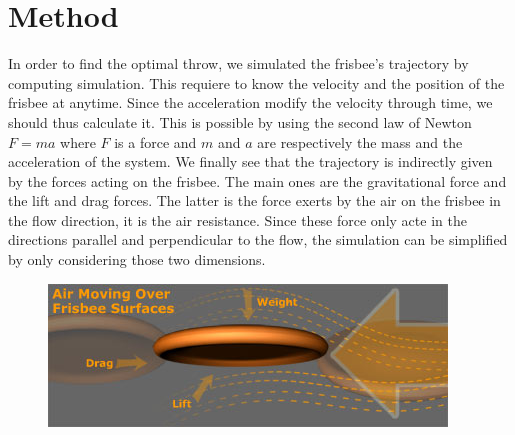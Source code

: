 \documentclass[10pt,a4paper]{report}
\begin{document}
\section{Method}
In order to find the optimal throw, we simulated the frisbee's trajectory by computing simulation. This requiere to know the velocity and the position of the frisbee at anytime. Since the acceleration modify the velocity through time, we should thus calculate it. This is possible by using the second law of Newton $F = ma$ where $F$ is a force and $m$ and $a$ are respectively the mass and the acceleration of the system. We finally see that the trajectory is indirectly given by the forces acting on the frisbee. The main ones are the gravitational force and the lift and drag forces. The latter is the force exerts by the air on the frisbee in the flow direction, it is the air resistance. Since these force only acte in the directions parallel and perpendicular to the flow, the simulation can be simplified by only considering those two dimensions.

\begin{figure}[h]
\centering
\includegraphics[scale=0.8]{forces.jpg}
\end{figure}
\end{document}
